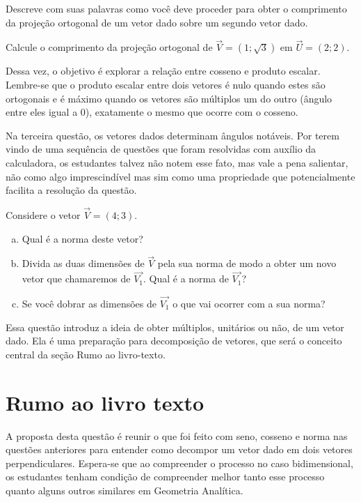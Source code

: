 \documentclass[main_estudante.tex]{subfiles}
\begin{document}
\begin{reflita}
 Descreve com suas palavras como você deve proceder para obter o comprimento da projeção ortogonal de um vetor dado sobre um segundo vetor dado.
\end{reflita}

\begin{questao}
\item Calcule o comprimento da projeção ortogonal de $\overrightarrow{V}=(1;\sqrt{3})$ em $\overrightarrow{U}=(2;2)$.
\end{questao}

Dessa vez, o objetivo é explorar a relação entre cosseno e produto escalar. Lembre-se que o produto escalar entre dois vetores é nulo quando estes são ortogonais e é máximo quando os vetores são múltiplos um do outro (ângulo entre eles igual a 0), exatamente o mesmo que ocorre com o cosseno.

Na terceira questão, os vetores dados determinam ângulos notáveis. Por terem vindo de uma sequência de questões que foram resolvidas com auxílio da calculadora, os estudantes talvez não notem esse fato, mas vale a pena salientar, não como algo imprescindível mas sim como uma propriedade que potencialmente facilita a resolução da questão.

\begin{questao}
Considere o vetor $\overrightarrow{V}=(4;3)$.
\begin{enumerate}[a)]
\item Qual é a norma deste vetor?
\item Divida as duas dimensões de $\overrightarrow{V}$ pela sua norma de modo a obter um novo vetor que chamaremos de $\overrightarrow{V_1}$. Qual é a norma de $\overrightarrow{V_1}$?
\item Se você dobrar as dimensões de $\overrightarrow{V_1}$ o que vai ocorrer com a sua norma?
\end{enumerate}
\end{questao}

Essa questão introduz a ideia de obter múltiplos, unitários ou não, de um vetor dado. Ela é uma preparação para decomposição de vetores, que será o conceito central da seção Rumo ao livro-texto.

\section{Rumo ao livro texto}

A proposta desta questão é reunir o que foi feito com seno, cosseno e norma nas questões anteriores para entender como decompor um vetor dado em dois vetores perpendiculares. Espera-se que ao compreender o processo no caso bidimensional, os estudantes tenham condição de compreender melhor tanto esse processo quanto alguns outros similares em Geometria Analítica.
\end{document}
